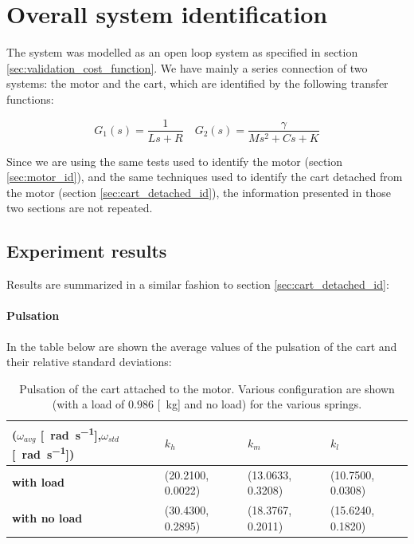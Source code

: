 \section{Overall system identification}
The system was modelled as an open loop system as specified in section \ref{sec:validation_cost_function}.
We have mainly  a series connection of two systems: the motor and the cart, which are identified by the following transfer functions:

$$G_1(s) = \frac{1}{Ls+R} \quad G_2(s) = \frac{\gamma}{Ms^2+Cs+K}$$

Since we are using the same tests used to identify the motor (section \ref{sec:motor_id}), and the same techniques used to identify the cart detached from the motor (section \ref{sec:cart_detached_id}), the information presented in those two sections are not repeated.
\subsection{Experiment results}
Results are summarized in a similar fashion to section \ref{sec:cart_detached_id}:
\paragraph{Pulsation}
In the table below are shown the average values of the pulsation of the cart and their relative standard deviations:
\begin{table}[!h]
\centering

\label{table: cart_attached_omega}
\begin{tabular}{|l|l|l|l|}
\hline
{(\textbf{$\omega_{avg}$} [\SI{}{\radian \per \second}],$\omega_{std}$ [\SI{}{\radian \per \second}])} & \textbf{$k_h$} & \textbf{$k_m$}   & \textbf{$k_l$}   \\ \hline
\textbf{with load}         & (20.2100, 0.0022)    & (13.0633, 0.3208) & (10.7500, 0.0308)      \\ \hline
\textbf{with no load}      & (30.4300, 0.2895)    & (18.3767, 0.2011) & (15.6240, 0.1820) \\ \hline
\end{tabular}
\caption{Pulsation of the cart  attached to the motor. Various configuration are shown (with a load of $0.986$ [\SI{}{\kilo \gram}] and no load) for the various springs. }
\end{table} \\ \\


